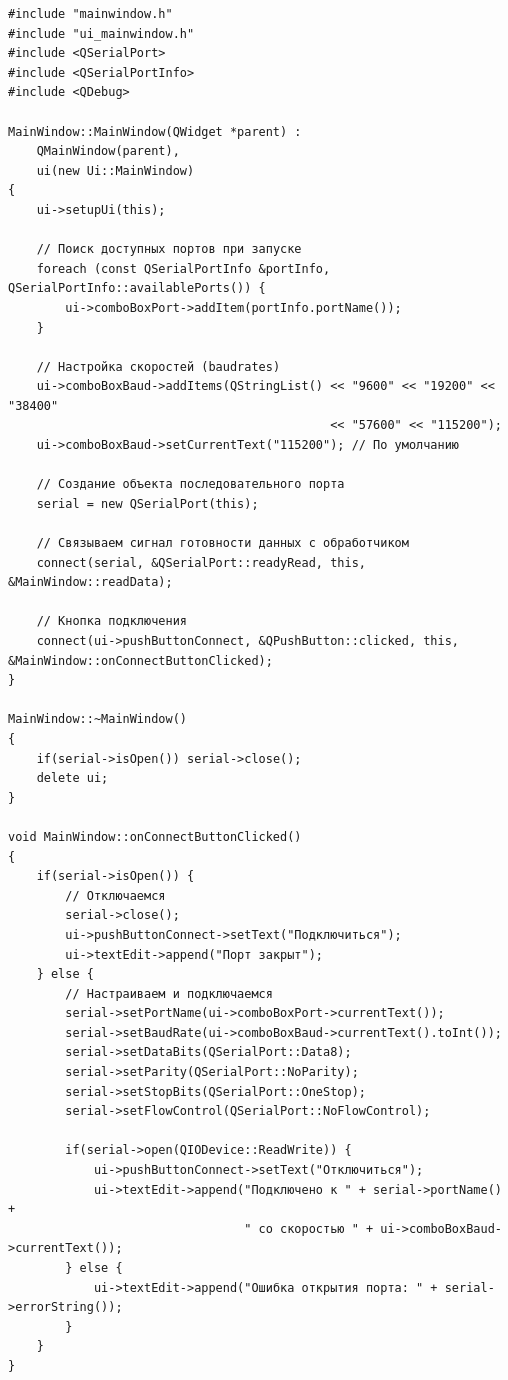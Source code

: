 \documentclass[12pt,a4paper]{article}
\begin{document}
\begin{lstlisting}[style=myCStyle, caption=Пример кода для проверки приема данных]
#include "mainwindow.h"
#include "ui_mainwindow.h"
#include <QSerialPort>
#include <QSerialPortInfo>
#include <QDebug>

MainWindow::MainWindow(QWidget *parent) :
    QMainWindow(parent),
    ui(new Ui::MainWindow)
{
    ui->setupUi(this);
    
    // Поиск доступных портов при запуске
    foreach (const QSerialPortInfo &portInfo, QSerialPortInfo::availablePorts()) {
        ui->comboBoxPort->addItem(portInfo.portName());
    }
    
    // Настройка скоростей (baudrates)
    ui->comboBoxBaud->addItems(QStringList() << "9600" << "19200" << "38400" 
                                             << "57600" << "115200");
    ui->comboBoxBaud->setCurrentText("115200"); // По умолчанию
    
    // Создание объекта последовательного порта
    serial = new QSerialPort(this);
    
    // Связываем сигнал готовности данных с обработчиком
    connect(serial, &QSerialPort::readyRead, this, &MainWindow::readData);
    
    // Кнопка подключения
    connect(ui->pushButtonConnect, &QPushButton::clicked, this, &MainWindow::onConnectButtonClicked);
}

MainWindow::~MainWindow()
{
    if(serial->isOpen()) serial->close();
    delete ui;
}

void MainWindow::onConnectButtonClicked()
{
    if(serial->isOpen()) {
        // Отключаемся
        serial->close();
        ui->pushButtonConnect->setText("Подключиться");
        ui->textEdit->append("Порт закрыт");
    } else {
        // Настраиваем и подключаемся
        serial->setPortName(ui->comboBoxPort->currentText());
        serial->setBaudRate(ui->comboBoxBaud->currentText().toInt());
        serial->setDataBits(QSerialPort::Data8);
        serial->setParity(QSerialPort::NoParity);
        serial->setStopBits(QSerialPort::OneStop);
        serial->setFlowControl(QSerialPort::NoFlowControl);
        
        if(serial->open(QIODevice::ReadWrite)) {
            ui->pushButtonConnect->setText("Отключиться");
            ui->textEdit->append("Подключено к " + serial->portName() + 
                                 " со скоростью " + ui->comboBoxBaud->currentText());
        } else {
            ui->textEdit->append("Ошибка открытия порта: " + serial->errorString());
        }
    }
}


\end{lstlisting}
\end{document}
